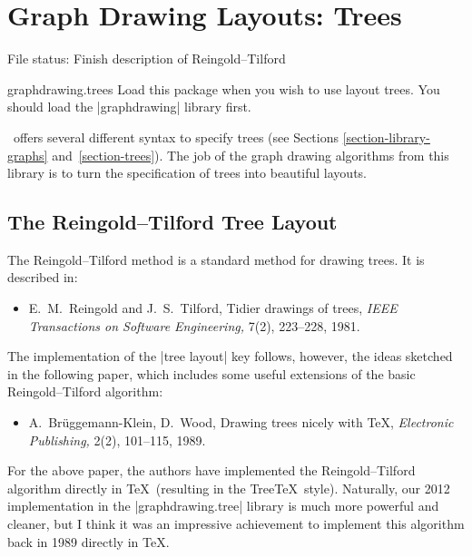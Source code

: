 %
%
%

\section{Graph Drawing Layouts: Trees}
\label{section-first-graphdrawing-library-in-manual}
\label{section-library-graphdrawing-trees}

{}

File status: Finish description of Reingold--Tilford

\begin{tikzlibrary}{graphdrawing.trees}
  Load this package when you wish to use layout trees. You should load
  the |graphdrawing| library first. 
\end{tikzlibrary}


\tikzname\ offers several different syntax to specify trees (see
Sections \ref{section-library-graphs}
and~\ref{section-trees}). The job of the graph drawing algorithms from
this library is to turn the specification of trees into beautiful
layouts. 


\subsection{The Reingold--Tilford Tree Layout}

The Reingold--Tilford method is a standard method for drawing
trees. It is described in:
\begin{itemize}
\item
  E.~M.\ Reingold and J.~S.\ Tilford,
  \newblock Tidier drawings of trees,
  \newblock \emph{IEEE Transactions on Software Engineering,}
  7(2), 223--228, 1981.
\end{itemize}
  
The implementation of the |tree layout| key follows, however, the
ideas sketched in the following paper, which includes some useful
extensions of the basic Reingold--Tilford algorithm:
\begin{itemize}
\item
  A.\ Br\"uggemann-Klein, D.\ Wood,
  \newblock Drawing trees nicely with \TeX,
  \emph{Electronic Publishing,} 2(2), 101--115, 1989.
\end{itemize}
For the above paper, the authors have implemented the
Reingold--Tilford algorithm directly in \TeX\ (resulting in the
Tree\TeX\ style). Naturally, our 2012 implementation in the
|graphdrawing.tree| library is much more powerful and cleaner, but I
think it was an impressive achievement to implement this algorithm
back in 1989 directly in \TeX.

